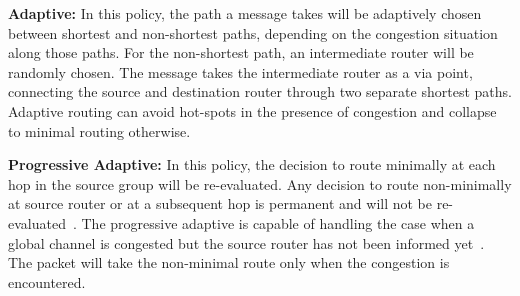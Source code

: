 \textbf{Adaptive:} In this policy, the path a message takes will be adaptively chosen between shortest and non-shortest paths, depending on the congestion situation along those paths. For the non-shortest path, an intermediate router will be randomly chosen. The message takes the intermediate router as a via point, connecting the source and destination router through two separate shortest paths. Adaptive routing can avoid hot-spots in the presence of congestion and collapse to minimal routing otherwise. 

\textbf{Progressive Adaptive:} In this policy, the decision to route minimally at each hop in the source group will be re-evaluated. Any decision to route non-minimally at source router or at a subsequent hop is permanent and will not be re-evaluated~\cite{jiang}. The progressive adaptive is capable of handling the case when a global channel is congested but the source router has not been informed yet~\cite{jiang}. The packet will take the non-minimal route only when the congestion is encountered. 


